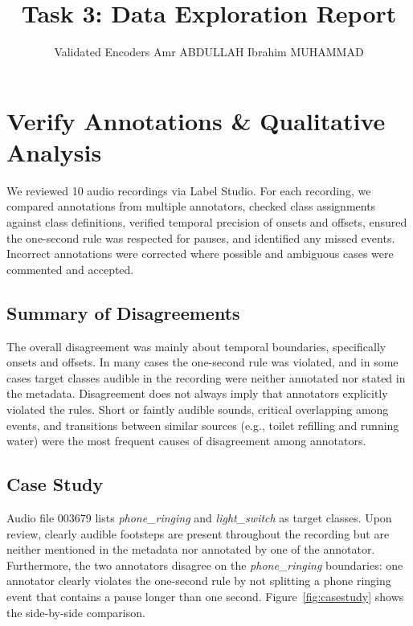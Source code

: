 \documentclass{article}
\title{Task 3: Data Exploration Report}
\author{%
   Validated Encoders \AND
  Amr ABDULLAH
  \And
  Ibrahim MUHAMMAD
}
\begin{document}
\maketitle

\section{Verify Annotations \& Qualitative Analysis}
We reviewed 10 audio recordings via Label Studio. For each recording, we compared annotations from multiple annotators, checked class assignments against class definitions, verified temporal precision of onsets and offsets, ensured the one-second rule was respected for pauses, and identified any missed events. Incorrect annotations were corrected where possible and ambiguous cases were commented and accepted.

\subsection{Summary of Disagreements}
The overall disagreement was mainly about temporal boundaries, specifically onsets and offsets. In many cases the one-second rule was violated, and in some cases target classes audible in the recording were neither annotated nor stated in the metadata. Disagreement does not always imply that annotators explicitly violated the rules. Short or faintly audible sounds, critical overlapping among events, and transitions between similar sources (e.g., toilet refilling and running water) were the most frequent causes of disagreement among annotators.

\subsection{Case Study}
Audio file 003679 lists \textit{phone\_ringing} and \textit{light\_switch} as target classes. Upon review, clearly audible footsteps are present throughout the recording but are neither mentioned in the metadata nor annotated by one of the annotator. Furthermore, the two annotators disagree on the \textit{phone\_ringing} boundaries: one annotator clearly violates the one-second rule by not splitting a phone ringing event that contains a pause longer than one second. Figure~\ref{fig:casestudy} shows the side-by-side comparison.
\end{document}
